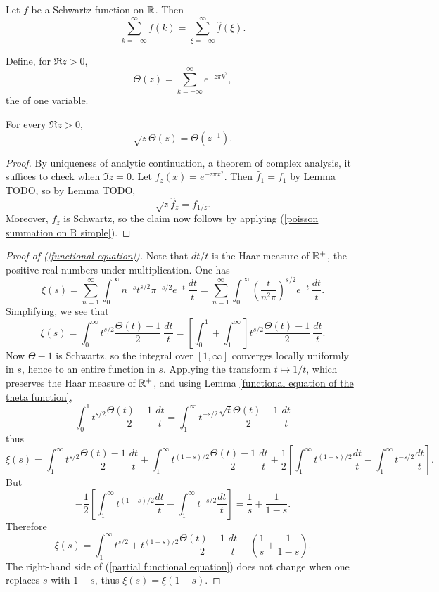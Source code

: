 \begin{corollary}
Let $f$ be a Schwartz function on $\mathbb{R}$. Then
\begin{equation}
\label{poisson summation on R simple}
\sum_{k=-\infty}^\infty f(k) = \sum_{\xi = -\infty}^\infty \hat f(\xi).
\end{equation}
\end{corollary}

\begin{definition}
Define, for $\Re z > 0$,
$$\Theta(z) = \sum_{k=-\infty}^\infty e^{-z\pi k^2},$$
the  of one variable.
\end{definition}

\begin{lemma}
\label{functional equation of the theta function}
For every $\Re z > 0$,
$$\sqrt z \Theta(z) = \Theta(z^{-1}).$$
\end{lemma}
\begin{proof}
By uniqueness of analytic continuation, a theorem of complex analysis, it suffices to check when $\Im z = 0$. Let $f_z(x) = e^{-z\pi x^2}$. Then $\hat f_1 = f_1$ by Lemma TODO, so by Lemma TODO,
$$\sqrt z \hat f_z = f_{1/z}.$$
Moreover, $f_z$ is Schwartz, so the claim now follows by applying (\ref{poisson summation on R simple}).
\end{proof}

\begin{proof}[Proof of (\ref{functional equation})]
Note that $dt/t$ is the Haar measure of $\mathbb{R}^+$, the positive real numbers under multiplication. One has
$$\xi(s) = \sum_{n=1}^\infty \int_0^\infty n^{-s} t^{s/2} \pi^{-s/2} e^{-t}~\frac{dt}{t} = \sum_{n=1}^\infty \int_0^\infty \left(\frac{t}{n^2\pi}\right)^{s/2}e^{-t}~\frac{dt}{t}.$$
Simplifying, we see that
$$\xi(s) = \int_0^\infty t^{s/2} \frac{\Theta(t) - 1}{2}~\frac{dt}{t} = \left[\int_0^1 + \int_1^\infty \right]t^{s/2} \frac{\Theta(t) - 1}{2}~\frac{dt}{t}.$$
Now $\Theta - 1$ is Schwartz, so the integral over $[1, \infty]$ converges locally uniformly in $s$, hence to an entire function in $s$.
Applying the transform $t \mapsto 1/t$, which preserves the Haar measure of $\mathbb{R}^+$, and using Lemma \ref{functional equation of the theta function},
$$\int_0^1 t^{s/2} \frac{\Theta(t) - 1}{2}~\frac{dt}{t} = \int_1^\infty t^{-s/2} \frac{\sqrt t \Theta(t) - 1}{2}~\frac{dt}{t}$$
thus
$$\xi(s) = \int_1^\infty t^{s/2} \frac{\Theta(t) - 1}{2}~\frac{dt}{t} + \int_1^\infty t^{(1-s)/2} \frac{\Theta(t) - 1}{2}~\frac{dt}{t} + \frac{1}{2} \left[\int_1^\infty t^{(1-s)/2} \frac{dt}{t} - \int_1^\infty t^{-s/2}\frac{dt}{t} \right].$$
But
$$-\frac{1}{2} \left[\int_1^\infty t^{(1-s)/2} \frac{dt}{t} - \int_1^\infty t^{-s/2}\frac{dt}{t} \right] = \frac{1}{s} + \frac{1}{1-s}.$$
Therefore
\begin{equation}
\label{partial functional equation}
\xi(s) = \int_1^\infty t^{s/2} + t^{(1-s)/2}\frac{\Theta(t) - 1}{2} ~\frac{dt}{t} - \left(\frac{1}{s} + \frac{1}{1-s}\right).
\end{equation}
The right-hand side of (\ref{partial functional equation}) does not change when one replaces $s$ with $1-s$, thus $\xi(s) = \xi(1-s)$.
\end{proof}
